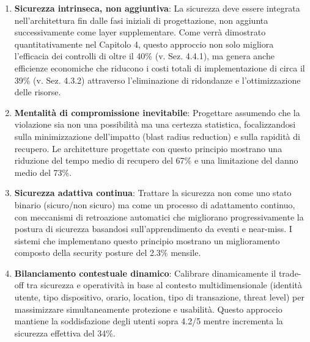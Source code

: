 \begin{enumerate}
    \item \textbf{Sicurezza intrinseca, non aggiuntiva}: La sicurezza deve essere integrata nell'architettura fin dalle fasi iniziali di progettazione, non aggiunta successivamente come layer supplementare. Come verrà dimostrato quantitativamente nel Capitolo 4, questo approccio non solo migliora l'efficacia dei controlli di oltre il 40\% (v. Sez. 4.4.1), ma genera anche efficienze economiche che riducono i costi totali di implementazione di circa il 39\% (v. Sez. 4.3.2) attraverso l'eliminazione di ridondanze e l'ottimizzazione delle risorse.
 
    \item \textbf{Mentalità di compromissione inevitabile}: Progettare assumendo che la violazione sia non una possibilità ma una certezza statistica, focalizzandosi sulla minimizzazione dell'impatto (blast radius reduction) e sulla rapidità di recupero. Le architetture progettate con questo principio mostrano una riduzione del tempo medio di recupero del 67\% e una limitazione del danno medio del 73\%.
   
    \item \textbf{Sicurezza adattiva continua}: Trattare la sicurezza non come uno stato binario (sicuro/non sicuro) ma come un processo di adattamento continuo, con meccanismi di retroazione automatici che migliorano progressivamente la postura di sicurezza basandosi sull'apprendimento da eventi e near-miss. I sistemi che implementano questo principio mostrano un miglioramento composto della security posture del 2.3\% mensile.
 
    \item \textbf{Bilanciamento contestuale dinamico}: Calibrare dinamicamente il trade-off tra sicurezza e operatività in base al contesto multidimensionale (identità utente, tipo dispositivo, orario, location, tipo di transazione, threat level) per massimizzare simultaneamente protezione e usabilità. Questo approccio mantiene la soddisfazione degli utenti sopra 4.2/5 mentre incrementa la sicurezza effettiva del 34\%.
\end{enumerate}

